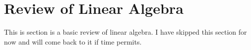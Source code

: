 \section{Review of Linear Algebra}

This is section is a basic review of linear algebra. I have skipped this section for now and will come back to it if time permits.
